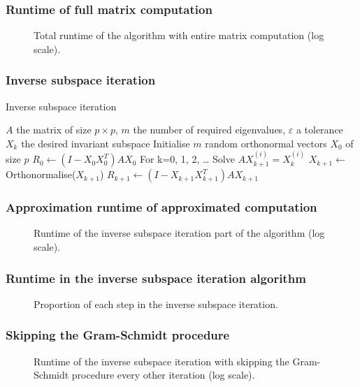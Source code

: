 \documentclass{beamer}
\begin{document}
\begin{frame}
 \frametitle{Runtime of full matrix computation}
 \begin{figure}[H]
  \centering
  
  \caption{Total runtime of the algorithm with entire matrix computation (log scale).}
 \end{figure}
\end{frame}

\begin{frame}
 \frametitle{Inverse subspace iteration}
 \begin{algorithm}[H]
  \caption{Inverse subspace iteration}
  \begin{algorithmic}
   \REQUIRE \(A\) the matrix of size \(p \times p\), \(m\) the number of required eigenvalues, \(\varepsilon\) a tolerance
   \ENSURE \(X_k\) the desired invariant subspace
   \STATE Initialise \(m\) random orthonormal vectors \(X_0\) of size \(p\)
   \STATE \(R_0 \gets (I - X_0 X_0^T) A X_0\)
   \STATE For k=0, 1, 2, \dots
     \STATE Solve \(A X_{k+1}^{(i)} = X_k^{(i)}\)
    \ENDFOR
    \STATE \(X_{k+1} \gets \) Orthonormalise(\(X_{k+1}\))
    \STATE \(R_{k+1} \gets (I - X_{k+1} X_{k+1}^T) A X_{k+1}\)
   \ENDWHILE
  \end{algorithmic}
 \end{algorithm}
\end{frame}

\begin{frame}
 \frametitle{Approximation runtime of approximated computation}
 \begin{figure}[H]
  \centering
  
  \caption{Runtime of the inverse subspace iteration part of the algorithm (log scale).}
 \end{figure}
\end{frame}

\begin{frame}
 \frametitle{Runtime in the inverse subspace iteration algorithm}
 \begin{figure}[H]
  \centering
  \scalebox{0.8}{}
  \caption{Proportion of each step in the inverse subspace iteration.}
 \end{figure}
\end{frame}

\begin{frame}
 \frametitle{Skipping the Gram-Schmidt procedure}
  \begin{figure}[H]
  \centering
  
  \caption{Runtime of the inverse subspace iteration with skipping the Gram-Schmidt procedure every other iteration (log scale).}
 \end{figure}
\end{frame}
\end{document}

